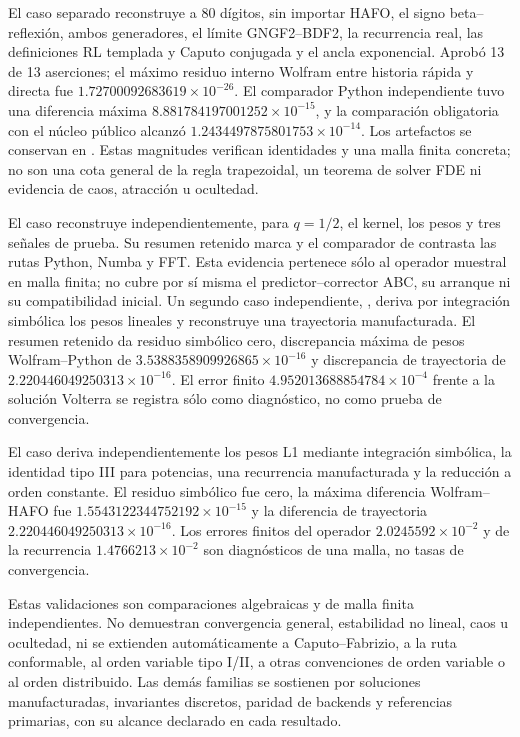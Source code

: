 El caso separado
reconstruye a 80 dígitos, sin importar HAFO, el signo beta--reflexión, ambos
generadores, el límite GNGF2--BDF2, la recurrencia real, las definiciones RL
templada y Caputo conjugada y el ancla exponencial. Aprobó 13 de 13 aserciones;
el máximo residuo interno Wolfram entre historia rápida y directa fue
\(1.72700092683619\times10^{-26}\). El comparador Python independiente tuvo
una diferencia máxima \(8.881784197001252\times10^{-15}\), y la comparación
obligatoria con el núcleo público
alcanzó \(1.2434497875801753\times10^{-14}\). Los artefactos se conservan en
.
Estas magnitudes verifican identidades y una malla finita concreta; no son una
cota general de la regla trapezoidal, un teorema de solver FDE ni evidencia de
caos, atracción u ocultedad.

El caso
 reconstruye
independientemente, para \(q=1/2\), el kernel, los pesos y tres señales de
prueba. Su resumen retenido marca  y el comparador de
 contrasta las rutas Python,
Numba y FFT. Esta evidencia pertenece sólo al operador muestral en malla finita;
no cubre por sí misma el predictor--corrector ABC, su arranque ni su
compatibilidad inicial. Un segundo caso independiente,
, deriva por
integración simbólica los pesos lineales y reconstruye una trayectoria
manufacturada. El resumen retenido da residuo simbólico cero, discrepancia máxima
de pesos Wolfram--Python de \(3.5388358909926865\times10^{-16}\) y discrepancia
de trayectoria de \(2.220446049250313\times10^{-16}\). El error finito
\(4.952013688854784\times10^{-4}\) frente a la solución Volterra se registra
sólo como diagnóstico, no como prueba de convergencia.

El caso
deriva independientemente los pesos L1 mediante integración simbólica, la
identidad tipo III para potencias, una recurrencia manufacturada y la reducción
a orden constante. El residuo simbólico fue cero, la máxima diferencia
Wolfram--HAFO fue \(1.5543122344752192\times10^{-15}\) y la diferencia de
trayectoria \(2.220446049250313\times10^{-16}\). Los errores finitos del operador
\(2.0245592\times10^{-2}\) y de la recurrencia
\(1.4766213\times10^{-2}\) son diagnósticos de una malla, no tasas de
convergencia.

Estas validaciones son comparaciones algebraicas y de malla finita
independientes. No
demuestran convergencia general, estabilidad no lineal, caos u ocultedad, ni
se extienden automáticamente a Caputo--Fabrizio, a la ruta conformable, al orden
variable tipo I/II, a otras convenciones de orden variable o al orden
distribuido. Las demás familias se
sostienen por soluciones manufacturadas,
invariantes discretos, paridad de backends y referencias primarias, con su
alcance declarado en cada resultado.
